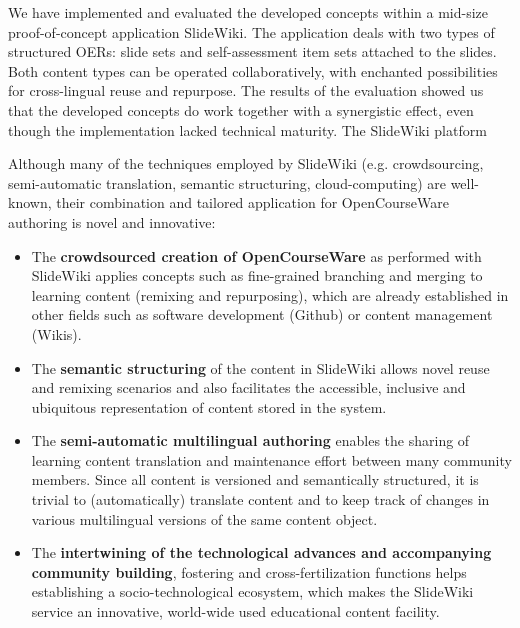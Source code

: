 \documentclass[ngerman,UKenglish,table]{scrbook}
\begin{document}
We have implemented and evaluated the developed concepts within a mid-size proof-of-concept application SlideWiki.
The application deals with two types of structured OERs: slide sets and self-assessment item sets attached to the slides.
Both content types can be operated collaboratively, with enchanted possibilities for cross-lingual reuse and repurpose.  
The results of the evaluation showed us that the developed concepts do work together with a synergistic effect, even though the implementation lacked technical maturity.
The SlideWiki platform 

Although many of the techniques employed by SlideWiki (e.g. crowdsourcing, semi-automatic translation, semantic structuring, cloud-computing) are well-known, their combination and tailored application for OpenCourseWare authoring is novel and innovative:
\begin{itemize}
\item The \textbf{crowdsourced creation of OpenCourseWare} as performed with SlideWiki applies concepts such as fine-grained branching and merging to learning content (remixing and repurposing), which are already established in other fields such as software development (Github) or content management (Wikis).
\item The \textbf{semantic structuring} of the content in SlideWiki allows novel reuse and remixing scenarios and also facilitates the accessible, inclusive and ubiquitous representation of content stored in the system.
\item The \textbf{semi-automatic multilingual authoring} enables the sharing of learning content translation and maintenance effort between many community members. Since all content is versioned and semantically structured, it is trivial to (automatically) translate content and to keep track of changes in various multilingual versions of the same content object.
\item The \textbf{intertwining of the technological advances and accompanying community building}, fostering and cross-fertilization functions helps establishing a socio-technological ecosystem, which makes the SlideWiki service an innovative, world-wide used educational content facility.
\end{itemize}
\end{document}
